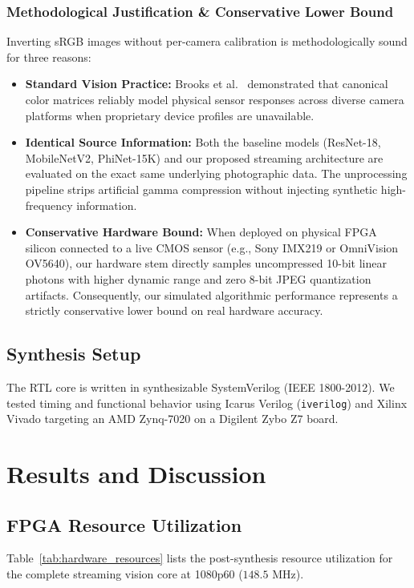 \documentclass[conference]{IEEEtran}
\begin{document}
\subsubsection{Methodological Justification \& Conservative Lower Bound}
Inverting sRGB images without per-camera calibration is methodologically sound for three reasons:
\begin{itemize}
    \item \textbf{Standard Vision Practice:} Brooks et al.~\cite{brooks2019unprocessing} demonstrated that canonical color matrices reliably model physical sensor responses across diverse camera platforms when proprietary device profiles are unavailable.
    \item \textbf{Identical Source Information:} Both the baseline models (ResNet-18, MobileNetV2, PhiNet-15K) and our proposed streaming architecture are evaluated on the exact same underlying photographic data. The unprocessing pipeline strips artificial gamma compression without injecting synthetic high-frequency information.
    \item \textbf{Conservative Hardware Bound:} When deployed on physical FPGA silicon connected to a live CMOS sensor (e.g., Sony IMX219 or OmniVision OV5640), our hardware stem directly samples uncompressed 10-bit linear photons with higher dynamic range and zero 8-bit JPEG quantization artifacts. Consequently, our simulated algorithmic performance represents a strictly conservative lower bound on real hardware accuracy.
\end{itemize}

\subsection{Synthesis Setup}
The RTL core is written in synthesizable SystemVerilog (IEEE 1800-2012). We tested timing and functional behavior using Icarus Verilog (\texttt{iverilog}) and Xilinx Vivado targeting an AMD Zynq-7020 on a Digilent Zybo Z7 board.

\section{Results and Discussion}
\label{sec:results}

\subsection{FPGA Resource Utilization}
Table~\ref{tab:hardware_resources} lists the post-synthesis resource utilization for the complete streaming vision core at 1080p60 ($148.5\text{ MHz}$).
\end{document}
